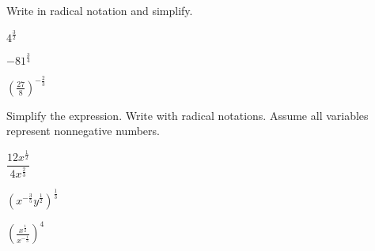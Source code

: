 \vfill
\begin{center} \hfill
\end{center}


\begin{exercise}Write in radical notation and simplify.
	\\
	\begin{enumerate*}[label={(\arabic*)~}]
		\item $4^{\frac32}$
		\item $-81^{\frac 34}$
		\item $\left(\frac{27}{8}\right)^{-\frac{2}{3}}$
		\hfill\null
	\end{enumerate*}
\end{exercise}
\vfill
\begin{center} \hfill
\end{center}

\newpage
\begin{exercise}Simplify the expression. Write with radical notations. Assume all variables represent nonnegative numbers.
	\\
	\begin{enumerate*}[label={(\arabic*)~}]
		\item $\dfrac{12x^{\frac12}}{4x^{\frac23}}$
		\item $(x^{-\frac35}y^{\frac12})^{\frac13}$
		\item $\left(\frac{x^{\frac12}}{x^{-\frac13}}\right)^4$
		\hspace{\fill}\null
	\end{enumerate*}
\end{exercise}
\vfill
\begin{center} \hfill
\end{center}


